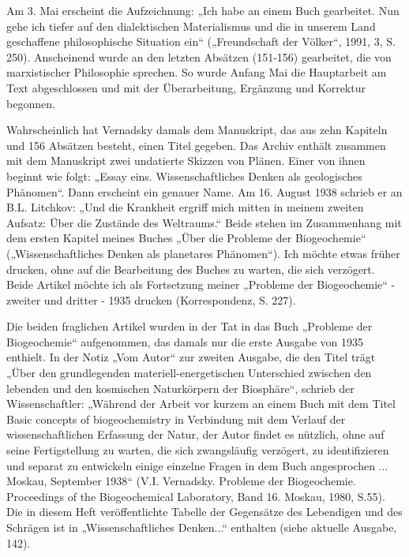 \documentclass[11pt,a4paper]{article}
\begin{document}
Am 3. Mai erscheint die Aufzeichnung: „Ich habe an einem Buch gearbeitet. Nun
gehe ich tiefer auf den dialektischen Materialismus und die in unserem Land
geschaffene philosophische Situation ein“ („Freundschaft der Völker“, 1991, 3,
S. 250). Anscheinend wurde an den letzten Absätzen (151-156) gearbeitet, die
von marxistischer Philosophie sprechen. So wurde Anfang Mai die Hauptarbeit am
Text abgeschlossen und mit der Überarbeitung, Ergänzung und Korrektur
begonnen.

Wahrscheinlich hat Vernadsky damals dem Manuskript, das aus zehn Kapiteln und
156 Absätzen besteht, einen Titel gegeben. Das Archiv enthält zusammen mit dem
Manuskript zwei undatierte Skizzen von Plänen. Einer von ihnen beginnt wie
folgt: „Essay eins. Wissenschaftliches Denken als geologisches Phänomen“. Dann
erscheint ein genauer Name. Am 16. August 1938 schrieb er an B.L. Litchkov:
„Und die Krankheit ergriff mich mitten in meinem zweiten Aufsatz: Über die
Zustände des Weltraums.“ Beide stehen im Zusammenhang mit dem ersten Kapitel
meines Buches „Über die Probleme der Biogeochemie“ („Wissenschaftliches Denken
als planetares Phänomen“). Ich möchte etwas früher drucken, ohne auf die
Bearbeitung des Buches zu warten, die sich verzögert. Beide Artikel möchte ich
als Fortsetzung meiner „Probleme der Biogeochemie“ - zweiter und dritter -
1935 drucken (Korrespondenz, S. 227).

Die beiden fraglichen Artikel wurden in der Tat in das Buch „Probleme der
Biogeochemie“ aufgenommen, das damals nur die erste Ausgabe von 1935
enthielt. In der Notiz „Vom Autor“ zur zweiten Ausgabe, die den Titel trägt
„Über den grundlegenden materiell-energetischen Unterschied zwischen den
lebenden und den kosmischen Naturkörpern der Biosphäre“, schrieb der
Wissenschaftler: „Während der Arbeit vor kurzem an einem Buch mit dem Titel
Basic concepts of biogeochemistry in Verbindung mit dem Verlauf der
wissenschaftlichen Erfassung der Natur, der Autor findet es nützlich, ohne auf
seine Fertigstellung zu warten, die sich zwangsläufig verzögert, zu
identifizieren und separat zu entwickeln einige einzelne Fragen in dem Buch
angesprochen ... Moskau, September 1938“ (V.I. Vernadsky. Probleme der
Biogeochemie. Proceedings of the Biogeochemical Laboratory, Band 16. Moskau,
1980, S.55). Die in diesem Heft veröffentlichte Tabelle der Gegensätze des
Lebendigen und des Schrägen ist in „Wissenschaftliches Denken...“ enthalten
(siehe aktuelle Ausgabe, 142).
\end{document}
